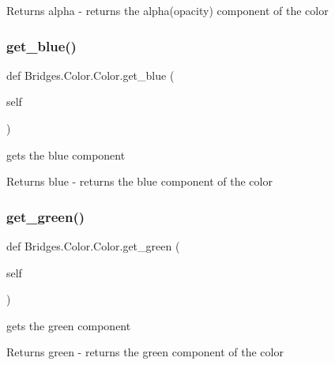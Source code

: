 \begin{DoxyReturn}{Returns}
alpha -\/ returns the alpha(opacity) component of the color 
\end{DoxyReturn}
\mbox{\label{class_bridges_1_1_color_1_1_color_abdcf7f0ca2f7288e58dad6f7ea5b9824}} 
\subsubsection{\texorpdfstring{get\+\_\+blue()}{get\_blue()}}
{\footnotesize\ttfamily def Bridges.\+Color.\+Color.\+get\+\_\+blue (\begin{DoxyParamCaption}\item[{}]{self }\end{DoxyParamCaption})}



gets the blue component 

\begin{DoxyReturn}{Returns}
blue -\/ returns the blue component of the color 
\end{DoxyReturn}
\mbox{\label{class_bridges_1_1_color_1_1_color_adf7fc94b1b5887936da71b361ead3e51}} 
\subsubsection{\texorpdfstring{get\+\_\+green()}{get\_green()}}
{\footnotesize\ttfamily def Bridges.\+Color.\+Color.\+get\+\_\+green (\begin{DoxyParamCaption}\item[{}]{self }\end{DoxyParamCaption})}



gets the green component 

\begin{DoxyReturn}{Returns}
green -\/ returns the green component of the color 
\end{DoxyReturn}
\mbox{\label{class_bridges_1_1_color_1_1_color_a5bb6cb1066b378968cdb7e61acc3e350}} 
